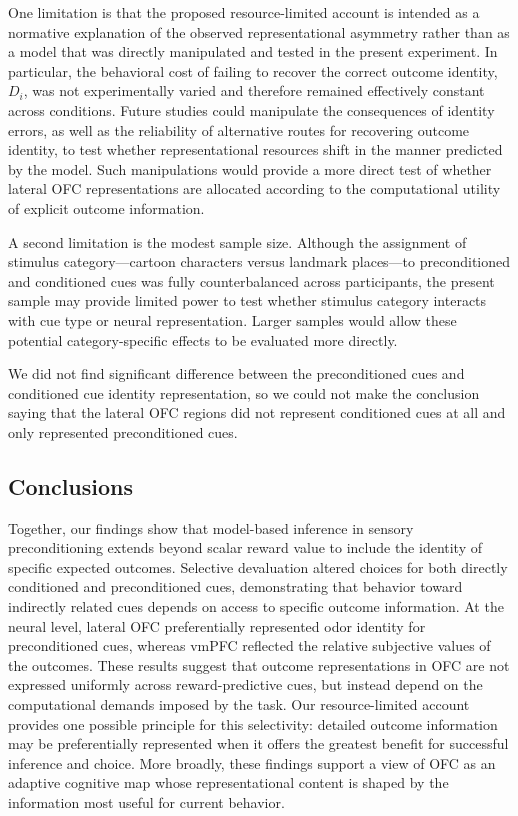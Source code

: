 \documentclass[12pt,letterpaper]{article}
\begin{document}
One limitation is that the proposed resource-limited account is intended as a normative explanation of the observed representational asymmetry rather than as a model that was directly manipulated and tested in the present experiment. In particular, the behavioral cost of failing to recover the correct outcome identity, \(D_i\), was not experimentally varied and therefore remained effectively constant across conditions. Future studies could manipulate the consequences of identity errors, as well as the reliability of alternative routes for recovering outcome identity, to test whether representational resources shift in the manner predicted by the model. Such manipulations would provide a more direct test of whether lateral OFC representations are allocated according to the computational utility of explicit outcome information.


A second limitation is the modest sample size. Although the assignment of stimulus category—cartoon characters versus landmark places—to preconditioned and conditioned cues was fully counterbalanced across participants, the present sample may provide limited power to test whether stimulus category interacts with cue type or neural representation. Larger samples would allow these potential category-specific effects to be evaluated more directly.

We did not find significant difference between the preconditioned cues and conditioned cue identity representation, so we could not make the conclusion saying that the lateral OFC regions did not represent conditioned cues at all and only represented preconditioned cues.


\subsection*{Conclusions}

Together, our findings show that model-based inference in sensory preconditioning extends beyond scalar reward value to include the identity of specific expected outcomes. Selective devaluation altered choices for both directly conditioned and preconditioned cues, demonstrating that behavior toward indirectly related cues depends on access to specific outcome information. At the neural level, lateral OFC preferentially represented odor identity for preconditioned cues, whereas vmPFC reflected the relative subjective values of the outcomes. These results suggest that outcome representations in OFC are not expressed uniformly across reward-predictive cues, but instead depend on the computational demands imposed by the task. Our resource-limited account provides one possible principle for this selectivity: detailed outcome information may be preferentially represented when it offers the greatest benefit for successful inference and choice. More broadly, these findings support a view of OFC as an adaptive cognitive map whose representational content is shaped by the information most useful for current behavior.
\end{document}
